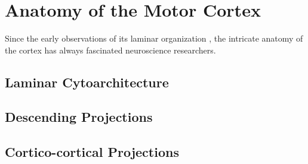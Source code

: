 \section{Anatomy of the Motor Cortex}

Since the early observations of its laminar organization \cite{Baillarger1840}, the intricate anatomy of the cortex has always fascinated neuroscience researchers.

\subsection{Laminar Cytoarchitecture}

\subsection{Descending Projections}

\subsection{Cortico-cortical Projections}

